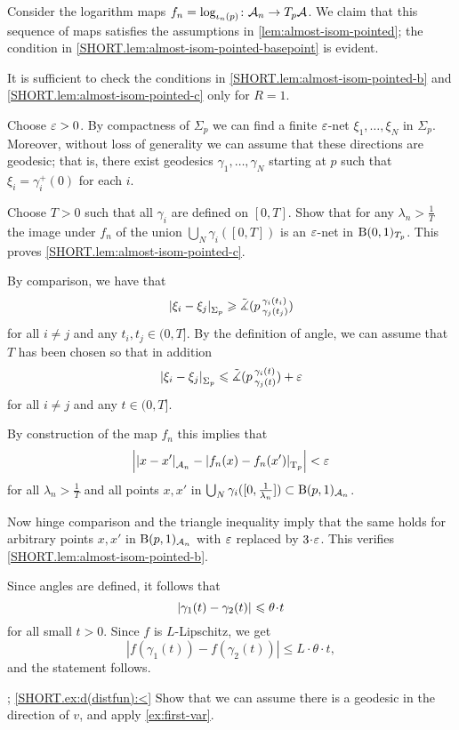 Consider the logarithm maps $f_n=\log_{\iota_n(p)}\colon\mathcal{A}_n\to T_p\mathcal{A}$.
We claim that this sequence of maps satisfies the assumptions in \ref{lem:almost-isom-pointed};
the condition in \ref{SHORT.lem:almost-isom-pointed-basepoint} is evident.  

It is sufficient to check the conditions in \ref{SHORT.lem:almost-isom-pointed-b} and \ref{SHORT.lem:almost-isom-pointed-c} only for $R=1$. 

Choose $\varepsilon>0$.
By compactness of $\Sigma_p$ we can find a finite $\varepsilon$-net $\xi_1,\dots,\xi_N$ in $\Sigma_p$. Moreover, without loss of generality we can assume that these directions are geodesic;
that is, there exist geodesics $\gamma_1,\ldots, \gamma_N$ starting at $p$ such that $\xi_i=\gamma_i^+(0)$ for each $i$.

Choose $T>0$ such that all $\gamma_i$ are defined on $[0,T]$.
Show that for any $\lambda_n>\frac{1}{T}$ the image under $f_n$ of the union $\bigcup_N\gamma_i([0,T])$ is an $\varepsilon$-net in $\mathrm{B}{}(0,1)_{T_p}$.
This proves \ref{SHORT.lem:almost-isom-pointed-c}.

By comparison, we have that
\[|{\xi_i}-{\xi_j}|_{\Sigma_p}^{{}}\geqslant \tilde\measuredangle(p\,{}^{\gamma_i(t_i)}_{\gamma_j(t_j)})\]
for all $i\ne j$ and any $t_i,t_j\in (0,T]$.
By the definition of angle, we can assume that $T$ has been chosen so that in addition
\[|{\xi_i}-{\xi_j}|_{\Sigma_p}^{{}}\leqslant \tilde\measuredangle(p\,{}^{\gamma_i(t)}_{\gamma_j(t)})+\varepsilon\]
for all $i\ne j$ and any $t\in (0,T]$.

By construction of the map $f_n$ this implies that 
\[\left||{x}-{x'}|_{\mathcal{A}_n}^{{}}-|{f_n(x)}-{f_n(x')}|_{\mathrm{T}_p}^{{}}\right|<\varepsilon\]
for all $\lambda_n>\frac{1}{T}$ and all points $x,x'$ in $\bigcup_N\gamma_i([0,\frac{1}{\lambda_n}])\subset \mathrm{B}{}(p,1)_{\mathcal{A}_n}$.
  
Now hinge comparison and the triangle inequality imply that the same  holds for arbitrary points $x,x'$  in  $\mathrm{B}{}(p,1)_{\mathcal{A}_n}$ with $\varepsilon$ replaced by $3\cdot\eps$.
This verifies \ref{SHORT.lem:almost-isom-pointed-b}.


Since angles are defined, it follows that 
\[\dist{\gamma_1(t)}{\gamma_2(t)}{}\le \theta\cdot t\]
for all small $t>0$.     
Since $f$ is $L$-Lipschitz, we get 
\[|f(\gamma_1(t))-f(\gamma_2(t))|\le L\cdot \theta\cdot t,\]
and the statement follows.

\parbf{\ref{ex:d(distfun)}}; \ref{SHORT.ex:d(distfun):<}
Show that we can assume there is a geodesic in the direction of $v$, and apply \ref{ex:first-var}.


